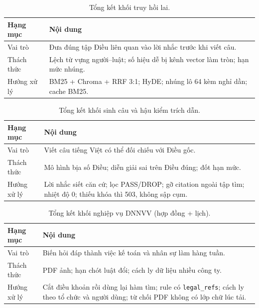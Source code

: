 \begin{table}[htp]
\centering
\caption{Tổng kết khối truy hồi lai.}
\label{tab:tong-ket-retrieval}
\begin{tabular}{p{2.2cm}p{11.5cm}}
\toprule
\textbf{Hạng mục} & \textbf{Nội dung} \\
\midrule
Vai trò & Đưa đúng tập Điều liên quan vào lời nhắc trước khi viết câu. \\
Thách thức & Lệch từ vựng người--luật; số hiệu dễ bị kênh vector làm tròn; hạn
mức nhúng. \\
Hướng xử lý & BM25 + Chroma + RRF 3:1; HyDE; nhúng lô 64 kèm nghỉ dần; cache
BM25. \\
\bottomrule
\end{tabular}
\end{table}

\begin{table}[htp]
\centering
\caption{Tổng kết khối sinh câu và hậu kiểm trích dẫn.}
\label{tab:tong-ket-generate}
\begin{tabular}{p{2.2cm}p{11.5cm}}
\toprule
\textbf{Hạng mục} & \textbf{Nội dung} \\
\midrule
Vai trò & Viết câu tiếng Việt có thể đối chiếu với Điều gốc. \\
Thách thức & Mô hình bịa số Điều; diễn giải sai trên Điều đúng; đốt hạn mức. \\
Hướng xử lý & Lời nhắc siết căn cứ; lọc PASS/DROP; gỡ citation ngoài tập tìm;
nhiệt độ 0; thiếu khóa thì 503, không sập cụm. \\
\bottomrule
\end{tabular}
\end{table}

\begin{table}[htp]
\centering
\caption{Tổng kết khối nghiệp vụ DNNVV (hợp đồng + lịch).}
\label{tab:tong-ket-sme}
\begin{tabular}{p{2.2cm}p{11.5cm}}
\toprule
\textbf{Hạng mục} & \textbf{Nội dung} \\
\midrule
Vai trò & Biến hỏi đáp thành việc kế toán và nhân sự làm hàng tuần. \\
Thách thức & PDF ảnh; hạn chót luật đổi; cách ly dữ liệu nhiều công ty. \\
Hướng xử lý & Cắt điều khoản rồi dùng lại hàm tìm; \soRule{} rule có
\texttt{legal\_refs}; cách ly theo tổ chức và người dùng; từ chối PDF không có
lớp chữ lúc tải. \\
\bottomrule
\end{tabular}
\end{table}

